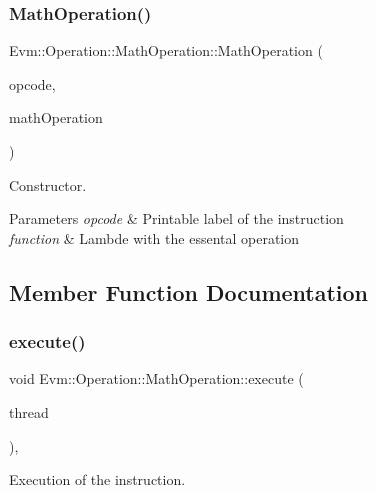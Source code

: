 \subsubsection{\texorpdfstring{Math\+Operation()}{MathOperation()}}
{\footnotesize\ttfamily Evm\+::\+Operation\+::\+Math\+Operation\+::\+Math\+Operation (\begin{DoxyParamCaption}\item[{string \&}]{opcode,  }\item[{function$<$ int64\+\_\+t(int64\+\_\+t, int64\+\_\+t)$>$}]{math\+Operation }\end{DoxyParamCaption})\hspace{0.3cm}{\ttfamily [inline]}}



Constructor. 


\begin{DoxyParams}{Parameters}
{\em opcode} & Printable label of the instruction \\
\hline
{\em function} & Lambde with the essental operation \\
\hline
\end{DoxyParams}


\subsection{Member Function Documentation}
\mbox{\label{struct_evm_1_1_operation_1_1_math_operation_a5ffc66e4ff4e6f59b1cd2512aad54380}} 
\subsubsection{\texorpdfstring{execute()}{execute()}}
{\footnotesize\ttfamily void Evm\+::\+Operation\+::\+Math\+Operation\+::execute (\begin{DoxyParamCaption}\item[{\mbox{\hyperlink{struct_evm_1_1_thread_context}{Thread\+Context}} \&}]{thread }\end{DoxyParamCaption})\hspace{0.3cm}{\ttfamily [override]}, {\ttfamily [virtual]}}



Execution of the instruction. 

